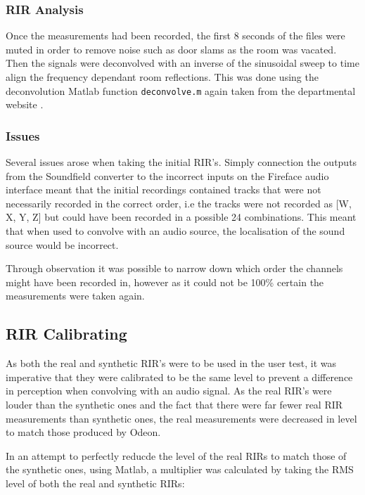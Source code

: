 \documentclass[../../main.tex]{subfiles}
\begin{document}
	\subsubsection{RIR Analysis}

		Once the measurements had been recorded, the first 8 seconds of the files were muted in order to remove noise such as door slams as the room was vacated. Then the signals were deconvolved with an inverse of the sinusoidal sweep to time align the frequency dependant room reflections. This was done using the deconvolution Matlab function \texttt{deconvolve.m} again taken from the departmental website \cite{sineSweep}.

	\subsubsection{Issues}
		Several issues arose when taking the initial \ac{RIR}'s. Simply connection the outputs from the Soundfield converter to the incorrect inputs on the Fireface audio interface meant that the initial recordings contained tracks that were not necessarily recorded in the correct order, i.e the tracks were not recorded as [W, X, Y, Z] but could have been recorded in a possible 24 combinations. This meant that when used to convolve with an audio source, the localisation of the sound source would be incorrect.

		Through observation it was possible to narrow down which order the channels might have been recorded in, however as it could not be 100\% certain the measurements were taken again.

\subsection{RIR Calibrating}
	
	As both the real and synthetic \ac{RIR}'s were to be used in the user test, it was imperative that they were calibrated to be the same level to prevent a difference in perception when convolving with an audio signal. As the real \ac{RIR}'s were louder than the synthetic ones and the fact that there were far fewer real \ac{RIR} measurements than synthetic ones, the real measurements were decreased in level to match those produced by Odeon.

	In an attempt to perfectly reducde the level of the real \ac{RIRs} to match those of the synthetic ones, using Matlab, a multiplier was calculated by taking the RMS level of both the real and synthetic \ac{RIRs}:
\end{document}
